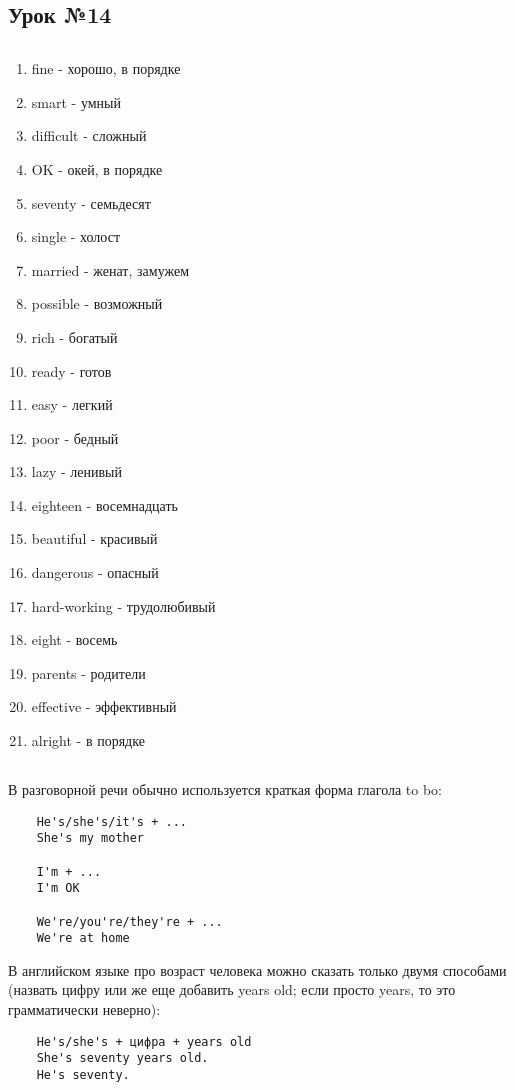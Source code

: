 \subsection{Урок №14}

\subsection*{}
\begin{multicols}{2}
    \begin{enumerate}\setlength{\itemsep}{0pt}
        \item fine - хорошо, в порядке
        \item smart - умный
        \item difficult - сложный
        \item OK - окей, в порядке
        \item seventy - семьдесят
        \item single - холост
        \item married - женат, замужем
        \item possible - возможный
        \item rich - богатый
        \item ready - готов
        \item easy - легкий
        \item poor - бедный
        \item lazy - ленивый
        \item eighteen - восемнадцать
        \item beautiful - красивый
        \item dangerous - опасный
        \item hard-working - трудолюбивый
        \item eight - восемь
        \item parents - родители
        \item effective - эффективный
        \item alright - в порядке
    \end{enumerate}
\end{multicols}

\subsection*{}
В разговорной речи обычно используется краткая форма глагола to bo:
\begin{verbatim}
    He's/she's/it's + ...
    She's my mother

    I'm + ...
    I'm OK

    We're/you're/they're + ...
    We're at home
\end{verbatim}

В английском языке про возраст человека можно сказать только двумя способами (назвать цифру или же еще
добавить years old; если просто years, то это грамматически неверно):
\begin{verbatim}
    He's/she's + цифра + years old
    She's seventy years old.
    He's seventy.
\end{verbatim}